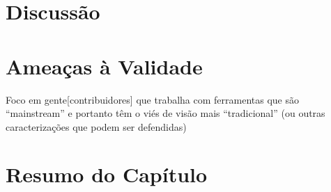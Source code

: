 \section{Discussão}
\label{sec:sug_melhoria_discussao}

\section{Ameaças à Validade}
\label{sec:sug_melhoria_ameacas}

Foco em gente[contribuidores] que trabalha com ferramentas que são
``mainstream'' e portanto têm o viés de visão mais ``tradicional'' (ou outras
caracterizações que podem ser defendidas)

\section{Resumo do Capítulo}
\label{sec:sug_melhoria_resumo}
